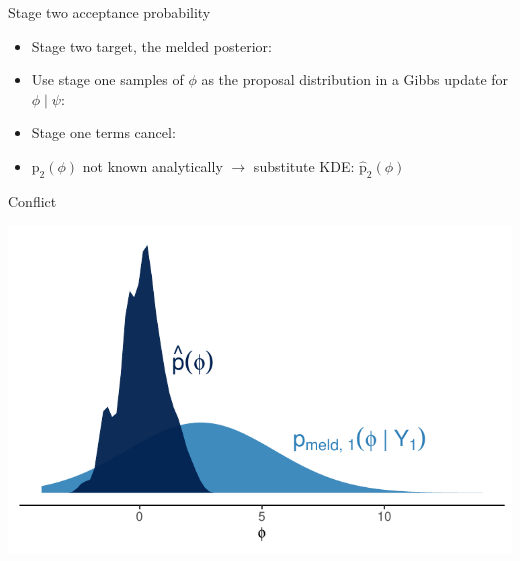 \documentclass[10pt,ignorenonframetext,]{beamer}
\providecommand{\tightlist}{%
  \setlength{\itemsep}{0pt}\setlength{\parskip}{0pt}}
\newcommand{\pd}{\text{p}}
\begin{document}
\begin{frame}{Stage two acceptance probability}

\begin{itemize}
\tightlist
\item
  Stage two target, the melded posterior:
  
\item
  Use stage one samples of \(\phi\) as the proposal distribution in a
  Gibbs update for \(\phi \mid \psi\):
  
\item
  Stage one terms cancel:
  
\item
  \(\pd_{2}(\phi)\) not known analytically \(\rightarrow\) substitute
  KDE: \(\hat{\pd}_{2}(\phi)\)
\end{itemize}

\end{frame}

\begin{frame}{Conflict}



\begin{center}\includegraphics[width=0.9\linewidth]{figures/conflict} \end{center}

\end{frame}
\end{document}
